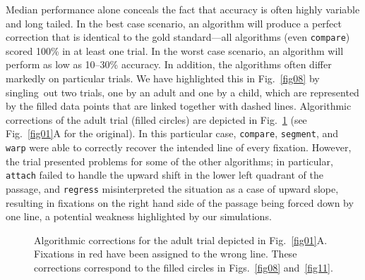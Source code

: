 \documentclass[doc,biblatex]{apa7}
\begin{document}
Median performance alone conceals the fact that accuracy is often highly variable and long tailed. In the best case scenario, an algorithm will produce a perfect correction that is identical to the gold standard---all algorithms (even \texttt{compare}) scored 100\% in at least one trial. In the worst case scenario, an algorithm will perform as low as 10--30\% accuracy. In addition, the algorithms often differ markedly on particular trials. We have highlighted this in Fig.~\ref{fig08} by singling~out two trials, one by an adult and one by a child, which are represented by the filled data points that are linked together with dashed lines. Algorithmic corrections of the adult trial (filled circles) are depicted in Fig.~\ref{fig09} (see Fig.~\ref{fig01}A for the original). In this particular case, \texttt{compare}, \texttt{segment}, and \texttt{warp} were able to correctly recover the intended line of every fixation. However, the trial presented problems for some of the other algorithms; in particular, \texttt{attach} failed to handle the upward shift in the lower left quadrant of the passage, and \texttt{regress} misinterpreted the situation as a case of upward slope, resulting in fixations on the right hand side of the passage being forced down by one line, a potential weakness highlighted by our simulations.

	\begin{figure}
	\vspace*{2pt}
	\caption{Algorithmic corrections for the adult trial depicted in Fig.~\ref{fig01}A. Fixations in red have been assigned to the wrong line. These corrections correspond to the filled circles in Figs.~\ref{fig08} and~\ref{fig11}.}
	\label{fig09}
	\end{figure}
\end{document}

